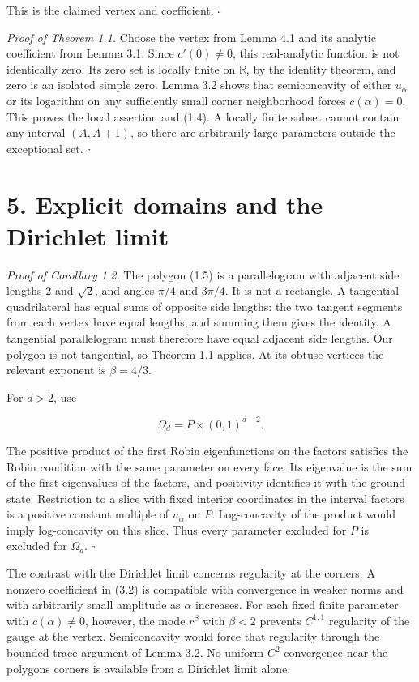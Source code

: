 \documentclass[11pt]{article}
\begin{document}
This is the claimed vertex and coefficient. \(\square\)

\emph{Proof of Theorem 1.1.} Choose the vertex from Lemma 4.1 and its
analytic coefficient from Lemma 3.1. Since \(c'(0)\ne0\), this
real-analytic function is not identically zero. Its zero set is locally
finite on \(\mathbb R\), by the identity theorem, and zero is an
isolated simple zero. Lemma 3.2 shows that semiconcavity of either
\(u_\alpha\) or its logarithm on any sufficiently small corner
neighborhood forces \(c(\alpha)=0\). This proves the local assertion and
(1.4). A locally finite subset cannot contain any interval \((A,A+1)\),
so there are arbitrarily large parameters outside the exceptional set. \(\square\)

\section{5. Explicit domains and the Dirichlet
limit}\label{explicit-domains-and-the-dirichlet-limit}

\emph{Proof of Corollary 1.2.} The polygon (1.5) is a parallelogram with
adjacent side lengths \(2\) and \(\sqrt2\), and angles \(\pi/4\) and
\(3\pi/4\). It is not a rectangle. A tangential quadrilateral has equal
sums of opposite side lengths: the two tangent segments from each vertex
have equal lengths, and summing them gives the identity. A tangential
parallelogram must therefore have equal adjacent side lengths. Our
polygon is not tangential, so Theorem 1.1 applies. At its obtuse
vertices the relevant exponent is \(\beta=4/3\).

For \(d>2\), use

\[
\Omega_d=P\times(0,1)^{d-2}.
\tag{5.1}
\]

The positive product of the first Robin eigenfunctions on the factors
satisfies the Robin condition with the same parameter on every face. Its
eigenvalue is the sum of the first eigenvalues of the factors, and
positivity identifies it with the ground state. Restriction to a slice
with fixed interior coordinates in the interval factors is a positive
constant multiple of \(u_\alpha\) on \(P\). Log-concavity of the product
would imply log-concavity on this slice. Thus every parameter excluded
for \(P\) is excluded for \(\Omega_d\). \(\square\)

The contrast with the Dirichlet limit concerns regularity at the
corners. A nonzero coefficient in (3.2) is compatible with convergence
in weaker norms and with arbitrarily small amplitude as \(\alpha\)
increases. For each fixed finite parameter with \(c(\alpha)\ne0\),
however, the mode \(r^\beta\) with \(\beta<2\) prevents \(C^{1,1}\)
regularity of the gauge at the vertex. Semiconcavity would force that
regularity through the bounded-trace argument of Lemma 3.2. No uniform
\(C^2\) convergence near the polygon\textquotesingle s corners is
available from a Dirichlet limit alone.
\end{document}
